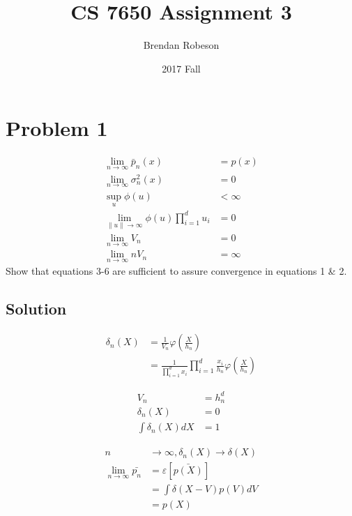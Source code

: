 \documentclass{IEEEtran}
\title{CS 7650 Assignment 3}
\author{Brendan Robeson}
\date{2017 Fall}
\begin{document}
\maketitle

\section{Problem 1} %
\begin{align}
    \lim_{n \to \infty} \bar{p}_n(x) &= p(x) \\
    \lim_{n \to \infty} \sigma_n^2(x) &= 0 \\
    \sup_u \phi(u) &< \infty \\
    \lim_{\|u\| \to \infty} \phi(u) \prod_{i=1}^d u_i &= 0 \\
    \lim_{n \to \infty} V_n &= 0 \\
    \lim_{n \to \infty} n V_n &= \infty
\end{align}
Show that equations 3-6 are sufficient to assure convergence in equations 1 \& 2.

\subsection{Solution}
\begin{align*}
    \delta_n(X) &= \frac{1}{V_n} \varphi \left( \frac{X}{h_n} \right) \\
    &= \frac{1}{\prod_{i=1}^d x_i} \prod_{i=1}^d \frac{x_i}{h_n} \varphi \left( \frac{X}{h_n} \right)
\end{align*}

\begin{align*}
    V_n &= h_n^d \\
    \delta_n(X) &= 0 \\
    \int \delta_n(X) dX &= 1
\end{align*}

\begin{align*}
    n &\to \infty, \delta_n(X) \to \delta(X) \\
    \lim_{n \to \infty} \bar{p_n} &= \varepsilon \left[ \bar{p(X)} \right] \\
    &= \int \delta(X - V) p(V) dV \\
    &= p(X)
\end{align*}
\end{document}
